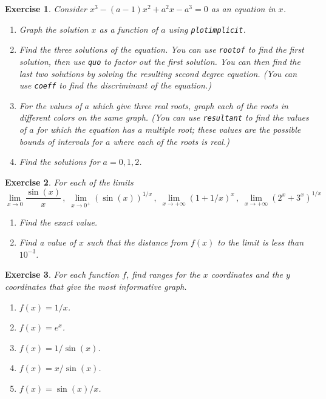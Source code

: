 \documentclass{article}
\newtheorem{exo}{Exercise}[section]
\begin{document}
\begin{exo}{\rm
Consider $x^3-(a-1)x^2+a^2x-a^3=0$ as an equation in $x$.
\begin{enumerate}
\item
Graph the solution $x$ as a function of $a$ using \texttt{plotimplicit}.
\item
Find the three solutions of the equation.  You can use \texttt{rootof}
to find the first solution, then use \texttt{quo} to factor out the
first solution.  You can then find the last two solutions by solving
the resulting second degree equation.  (You can use \texttt{coeff} to
find the discriminant of the equation.)
\item
For the values of $a$ which give three real roots, graph each of the
roots in different colors on the same graph.
(You can use \texttt{resultant} to find the values of $a$ for which the
equation has a multiple root; these values are the possible bounds of
intervals for $a$ where each of the roots is real.)
\item
Find the solutions for $a=0,1,2$.
\end{enumerate} 
}\end{exo}
\begin{exo}{\rm
For each of the limits
\[
\lim_{x\rightarrow 0} \frac{\sin(x)}{x}
\,,\;
\lim_{x\rightarrow 0^+} (\sin(x))^{1/x}
\,,\;
\lim_{x\rightarrow +\infty} (1+1/x)^{x}
\,,\;
\lim_{x\rightarrow +\infty} (2^x+3^x)^{1/x}
\]
\begin{enumerate}
\item
Find the exact value.
\item
Find a value of $x$ such that the distance from $f(x)$ to the limit is
less than $10^{-3}$.
\end{enumerate} 
}\end{exo}
\begin{exo}{\rm
For each function $f$, find ranges for the $x$ coordinates and the $y$
coordinates that give the most informative graph.
\begin{enumerate}
\item
$f(x)=1/x$.
\item
$f(x)=e^x$.
\item
$f(x)=1/\sin(x)$.
\item
$f(x)=x/\sin(x)$.
\item
$f(x)=\sin(x)/x$.
\end{enumerate} 
}\end{exo}
\end{document}
